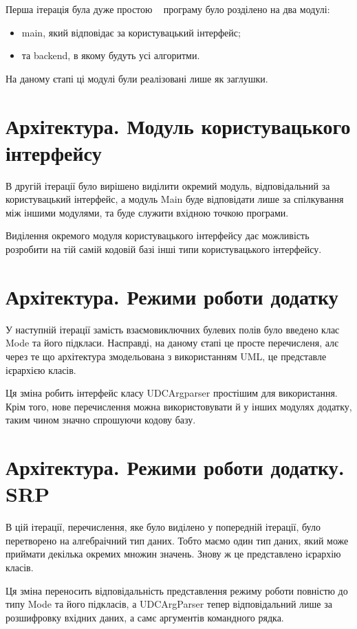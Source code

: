 \documentclass{article}
\let\oldsection\section
\renewcommand{\section}{\clearpage\oldsection}
\begin{document}
Перша ітерація була дуже простою \textemdash~ програму було розділено на два модулі:
\begin{itemize}
\item main, який відповідає за користувацький інтерфейс;
\item та backend, в якому будуть усі алгоритми.
\end{itemize}

На даному єтапі ці модулі були реалізовані лише як заглушки.

\section{Архітектура. Модуль користувацького інтерфейсу}
В другій ітерації було вирішено виділити окремий модуль, відповідальний за користувацький інтерфейс,
а модуль Main буде відповідати лише за спілкування між іншими модулями,
та буде служити вхідною точкою програми.

Виділення окремого модуля користувацького інтерфейсу
дає можливість розробити на тій самій кодовій базі інші типи користувацького інтерфейсу. 

\section{Архітектура. Режими роботи додатку}
У наступній ітерації замість взаємовиключних булевих полів було введено клас Mode
та його підкласи. Насправді, на даному єтапі це просте перечисленя,
алє через те що архітектура змодельована з використанням UML, це представле ієрархією класів.

Ця зміна робить інтерфейс класу UDCArgparser простішим для використання.
Крім того, нове перечислення можна використовувати й у інших модулях додатку,
таким чином значно спрошуючи кодову базу.

\section{Архітектура. Режими роботи додатку. SRP}
В цій ітерації, перечислення, яке було виділено у попередній ітерації,
було перетворено на алгебраічний тип даних. Тобто маємо один тип даних,
який може приймати декілька окремих множин значень. Знову ж це представлено ієрархію класів.

Ця зміна переносить відповідальність представлення режиму роботи повністю
до типу Mode та його підкласів, а UDCArgParser тепер відповідальний лише за
розшифровку вхідних даних, а самє аргументів командного рядка.
\end{document}
